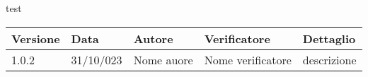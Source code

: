 \documentclass{article}
\begin{document}
    test
    \begin{tabular}{|C{2.5cm}|C{2.5cm}|C{2.5cm}|C{2.5cm}|C{2.5cm}|}
        \hline
        \textbf{Versione} & \textbf{Data} & \textbf{Autore} & \textbf{Verificatore} & \textbf{Dettaglio} \\
        \hline \hline
        \label{Git_Action_Version} 1.0.2 & 31/10/023 & Nome auore & Nome verificatore & descrizione \\
        \hline
    
    \end{tabular}
\end{document}
